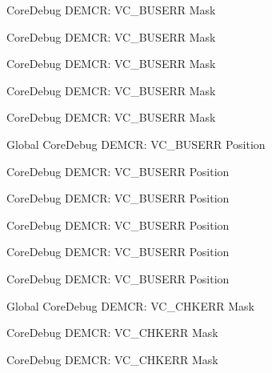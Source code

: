 \begin{DoxyRefList}
\label{deprecated__deprecated000613}%
%
Core\+Debug DEMCR\+: VC\+\_\+\+BUSERR Mask 

\label{deprecated__deprecated000346}%
%
Core\+Debug DEMCR\+: VC\+\_\+\+BUSERR Mask 

\label{deprecated__deprecated000511}%
%
Core\+Debug DEMCR\+: VC\+\_\+\+BUSERR Mask 

\label{deprecated__deprecated000060}%
%
Core\+Debug DEMCR\+: VC\+\_\+\+BUSERR Mask 

\label{deprecated__deprecated000204}%
%
Core\+Debug DEMCR\+: VC\+\_\+\+BUSERR Mask  
\item[Global \doxylink{group___c_m_s_i_s___core_debug_gab8e3d8f0f9590a51bbf10f6da3ad6933}{Core\+Debug\+\_\+\+DEMCR\+\_\+\+VC\+\_\+\+BUSERR\+\_\+\+Pos} ]\label{deprecated__deprecated000059}%
%
Core\+Debug DEMCR\+: VC\+\_\+\+BUSERR Position 

\label{deprecated__deprecated000345}%
%
Core\+Debug DEMCR\+: VC\+\_\+\+BUSERR Position 

\label{deprecated__deprecated000203}%
%
Core\+Debug DEMCR\+: VC\+\_\+\+BUSERR Position 

\label{deprecated__deprecated000421}%
%
Core\+Debug DEMCR\+: VC\+\_\+\+BUSERR Position 

\label{deprecated__deprecated000510}%
%
Core\+Debug DEMCR\+: VC\+\_\+\+BUSERR Position 

\label{deprecated__deprecated000612}%
%
Core\+Debug DEMCR\+: VC\+\_\+\+BUSERR Position  
\item[Global \doxylink{group___c_m_s_i_s___core_debug_ga2f98b461d19746ab2febfddebb73da6f}{Core\+Debug\+\_\+\+DEMCR\+\_\+\+VC\+\_\+\+CHKERR\+\_\+\+Msk} ]\label{deprecated__deprecated000208}%
%
Core\+Debug DEMCR\+: VC\+\_\+\+CHKERR Mask 

\label{deprecated__deprecated000350}%
%
Core\+Debug DEMCR\+: VC\+\_\+\+CHKERR Mask 

\label{deprecated__deprecated000064}%
%
Core\+Debug DEMCR\+: VC\+\_\+\+CHKERR Mask 


\end{DoxyRefList}
